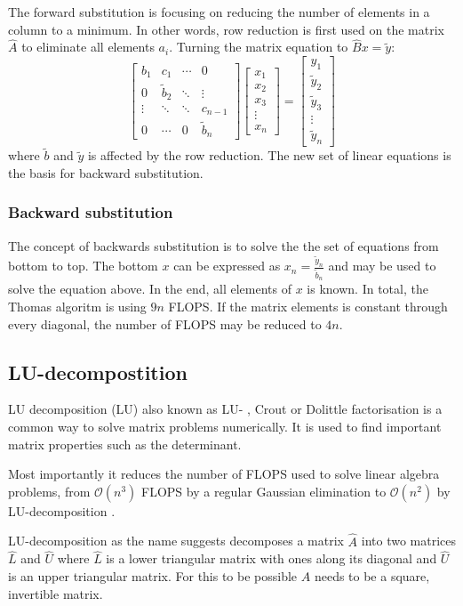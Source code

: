 \documentclass[twoside,twocolumn]{article}
\newcommand{\nl}{

\medskip
\noindent
}
\begin{document}
The forward substitution is focusing on reducing the number of elements in a column to a minimum. In other words, row reduction is first used on the matrix $\hat{A}$ to eliminate all elements $a_{i}$. Turning the matrix equation to $\hat{B}x=\tilde{y}$:
\begin{equation*}
\begin{bmatrix}
b_1&c_1&\cdots &0\\
0&\tilde{b}_2&\ddots & \vdots\\
\vdots&\ddots&\ddots&c_{n-1}\\
0&\cdots&0&\tilde{b}_n
\end{bmatrix}
\begin{bmatrix}
x_1\\x_2\\x_3\\\vdots\\x_{n}
\end{bmatrix}=
\begin{bmatrix}
y_1\\\tilde{y}_2\\\tilde{y}_3\\\vdots\\\tilde{y}_{n}
\end{bmatrix} 
\end{equation*}
where $\tilde{b}$ and $\tilde{y}$ is affected by the row reduction. The new set of linear equations is the basis for backward substitution.

\subsubsection{Backward substitution}

The concept of backwards substitution is to solve the the set of equations from bottom to top. The bottom $x$ can be expressed as $x_n=\frac{\tilde{y}_n}{\tilde{b}_n}$ and may be used to solve the equation above. In the end, all elements of $x$ is known. In total, the Thomas algoritm is using $9n$ FLOPS. If the matrix elements is constant through every diagonal, the number of FLOPS may be reduced to $4n$.

\subsection{LU-decompostition}
LU decomposition (LU) also known as LU- , Crout or Dolittle factorisation \cite{linalg:lay}\cite{compfys} is a common way to solve matrix problems numerically. It is used to find important matrix properties such as the determinant.
\nl
Most importantly it reduces the number of FLOPS used to solve linear algebra problems, from 
$\mathcal{O}(n^3)$ FLOPS by a regular Gaussian elimination to $\mathcal{O}(n^2)$ by LU-decomposition \cite{compfys}.
\nl
LU-decomposition as the name suggests decomposes a matrix $\hat{A}$ into two matrices $\hat{L}$ and $\hat{U}$ where $\hat{L}$ is a lower triangular matrix with ones along its diagonal and $\hat{U}$ is an upper triangular matrix. For this to be possible $\hat{A}$ needs to be a square, invertible matrix.
\end{document}
